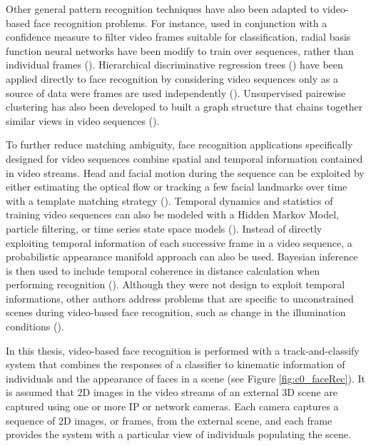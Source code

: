 Other general pattern recognition techniques have also been adapted to video-based face recognition problems.
For instance, used in conjunction with a confidence measure to filter video frames suitable for classification, radial basis function neural networks have been modify to train over sequences, rather than individual frames (\cite{koh02, balasubramanian09}).
Hierarchical discriminative regression trees (\cite{hwang00}) have been applied directly to face recognition by considering video sequences only as a source of data were frames are used independently (\cite{weng00}).
Unsupervised pairewise clustering has also been developed to built a graph structure that chains together similar views in video sequences (\cite{raytchev03}).

To further reduce matching ambiguity, face recognition applications specifically designed for video sequences combine spatial and temporal information contained in video streams.
Head and facial motion during the sequence can be exploited by either estimating the optical flow or tracking a few facial landmarks over time with a template matching strategy (\cite{chen01}).
Temporal dynamics and statistics of training video sequences can also be modeled with a Hidden Markov Model, particle filtering, or time series state space models (\cite{hadid04, li01, liu03, zhou03}).
Instead of directly exploiting temporal information of each successive frame in a video sequence, a probabilistic appearance manifold approach can also be used.
Bayesian inference is then used to include temporal coherence in distance calculation when performing recognition (\cite{cevikalp10, lee05, wang08}).
Although they were not design to exploit temporal informations, other authors address problems that are specific to unconstrained scenes during video-based face recognition, such as change in the illumination conditions (\cite{arandjelovic09, wang10}).

\begin{figure*}[t] \centering
  \caption{A generic track-and-classify biometric system for video-based face recognition}
	\label{fig:c0_faceRec}
\end{figure*}

In this thesis, video-based face recognition is performed with a track-and-classify system that combines the responses of a classifier to kinematic information of individuals and the appearance of faces in a scene (see Figure \ref{fig:c0_faceRec}).
It is assumed that 2D images in the video streams of an external 3D scene are captured using one or more IP or network cameras.
Each camera captures a sequence of 2D images, or frames, from the external scene, and each frame provides the system with a particular view of individuals populating the scene.

